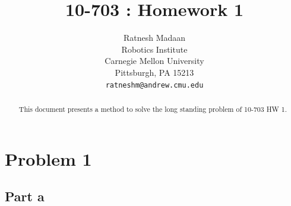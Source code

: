 \documentclass{article}
\title{10-703 : Homework 1}
\author{
  Ratnesh Madaan\\
  Robotics Institute\\
  Carnegie Mellon University\\
  Pittsburgh, PA 15213 \\
  \texttt{ratneshm@andrew.cmu.edu} \\
}
\begin{document}

\maketitle

\begin{abstract}
 	This document presents a method to solve the long standing problem of 10-703 HW 1.  
\end{abstract}

\section{Problem 1}
\subsection{Part a}
\end{document}
